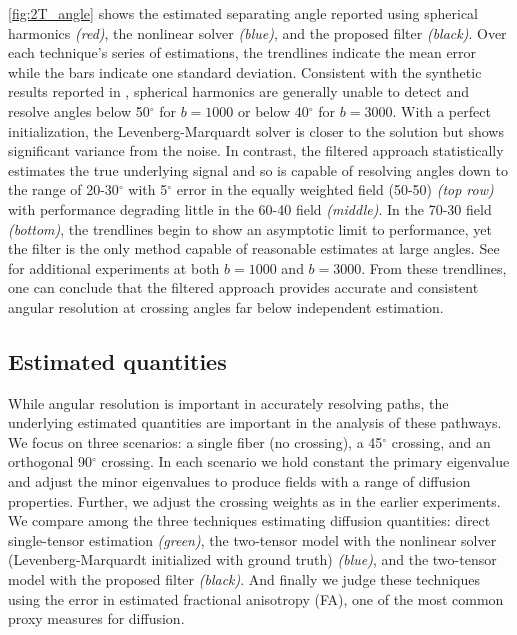 \documentclass[final,hyperref]{gatech-thesis}
\newcommand{\citet}[1]{\cite{#1}} %
\renewcommand{\deg}{\ensuremath{^\circ}\xspace}
\newcommand{\bn}[1]{\ensuremath{b\!=\!#1}\xspace}
\newcommand{\bone}{\bn{1000}}
\newcommand{\bthree}{\bn{3000}}
\begin{document}
\autoref{fig:2T_angle} shows the estimated separating angle reported using
spherical harmonics \textit{(red)}, the nonlinear solver \textit{(blue)}, and
the proposed filter \textit{(black)}.  Over each technique's series of
estimations, the trendlines indicate the mean error while the bars indicate
one standard deviation.
%
Consistent with the synthetic results reported in
\cite{Descoteaux2009tmi,Descoteaux2007mrm}, spherical harmonics are generally
unable to detect and resolve angles below 50\deg for \bone or below 40\deg for
\bthree.  With a perfect initialization, the Levenberg-Marquardt solver is
closer to the solution but shows significant variance from the noise.  In
contrast, the filtered approach statistically estimates the true underlying
signal and so is capable of resolving angles down to the range of 20-30\deg
with 5\deg error in the equally weighted field (50-50) \textit{(top row)} with
performance degrading little in the 60-40 field \textit{(middle)}.  In the
70-30 field \textit{(bottom)}, the trendlines begin to show an asymptotic
limit to performance, yet the filter is the only method capable of reasonable
estimates at large angles.  See \citet{Malcolm2009ipmi} for additional
experiments at both \bone and \bthree.  From these trendlines, one can
conclude that the filtered approach provides accurate and consistent angular
resolution at crossing angles far below independent estimation.




\subsection{Estimated quantities} \label{sec:quantities}

While angular resolution is important in accurately resolving paths, the
underlying estimated quantities are important in the analysis of these
pathways.
%
We focus on three scenarios: a single fiber (no crossing), a 45\deg crossing,
and an orthogonal 90\deg crossing.  In each scenario we hold constant the
primary eigenvalue and adjust the minor eigenvalues to produce fields with a
range of diffusion properties.  Further, we adjust the crossing weights as in
the earlier experiments.
%
We compare among the three techniques estimating diffusion quantities: direct
single-tensor estimation \textit{(green)}, the two-tensor model with the
nonlinear solver (Levenberg-Marquardt initialized with ground truth)
\textit{(blue)}, and the two-tensor model with the proposed filter
\textit{(black)}.
%
And finally we judge these techniques using the error in estimated fractional
anisotropy (FA), one of the most common proxy measures for diffusion.
\end{document}
